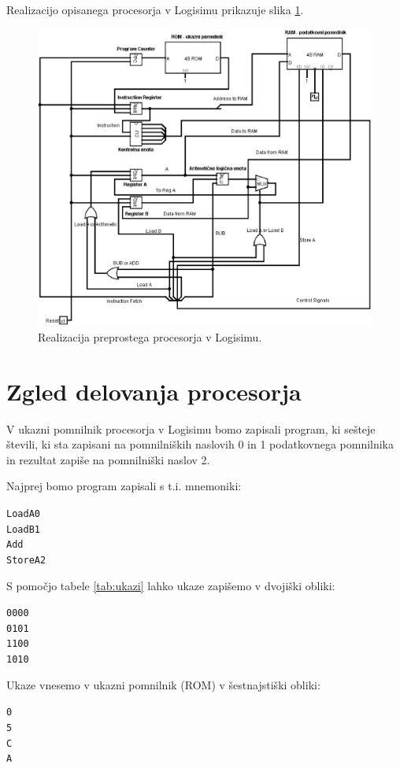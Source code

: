 Realizacijo opisanega procesorja v Logisimu prikazuje slika \ref{fig:procesor}.

\begin{figure}[htbf]%
\begin{center}
\includegraphics[width=0.75\columnwidth]{procesor/img/procesor}%
\caption{Realizacija preprostega procesorja v Logisimu.}%
\label{fig:procesor}%
\end{center}
\end{figure}


\section{Zgled delovanja procesorja}
\begin{zgled}
V ukazni pomnilnik procesorja v Logisimu bomo zapisali program, ki sešteje števili, ki sta zapisani na pomnilniških naslovih 0 in 1 podatkovnega pomnilnika in rezultat zapiše na pomnilniški naslov 2.

Najprej bomo program zapisali s t.i. mnemoniki:
\begin{alltt}
Load A 0
Load B 1
Add
Store A 2
\end{alltt}

S pomočjo tabele \ref{tab:ukazi} lahko ukaze zapišemo v dvojiški obliki:
\begin{alltt}
0000
0101
1100
1010
\end{alltt}

Ukaze vnesemo v ukazni pomnilnik (ROM) v šestnajstiški obliki:
\begin{alltt}
0
5
C
A
\end{alltt}

\end{zgled}

